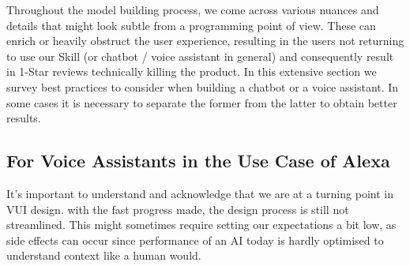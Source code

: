 \label{designbestprac}


Throughout the model building process, we come across various nuances and details that might look subtle from a programming point of view. %
These can enrich or %
heavily obstruct the user experience, resulting in the users not returning to use our Skill (or chatbot / voice assistant in general) %
and consequently result in 1-Star reviews technically killing the product.
%
In this extensive section we survey best practices to consider when building a chatbot or a voice assistant. In some cases it is necessary to separate the former from the latter to obtain better results.


\subsection*{For Voice Assistants in the Use Case of Alexa}
\label{designalexa:bestprac}





It's important to understand and acknowledge that we are at a turning point %
in VUI design.%
with the fast progress made, the design process is still %
not streamlined. %
This might sometimes require setting our expectations a bit low, as side effects can occur since %
performance of an AI today is hardly optimised to understand context like a human would. %
  
